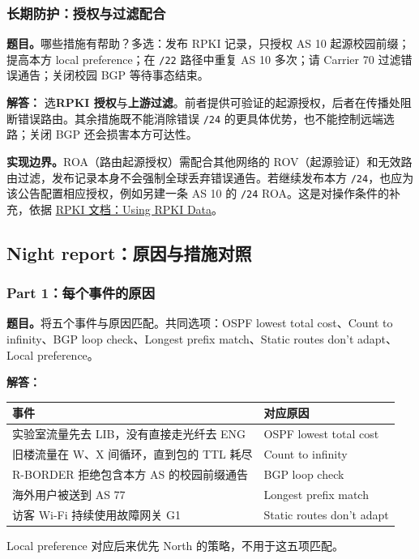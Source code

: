 \documentclass[11pt,a4paper,fontset=fandol]{ctexart}
\renewcommand{\exercisequestion}[2]{%
  \Needspace{5\baselineskip}%
  \subsubsection{#2}\label{exercise:#1}%
}
\renewenvironment{checkedsolution}
  {\par\nopagebreak[4]\textbf{解答：}\ignorespaces}
  {\par}
\begin{document}
\exercisequestion{SC2008-HW03-Q21}{长期防护：授权与过滤配合}
\textbf{题目。}哪些措施有帮助？多选：发布 RPKI 记录，只授权 AS 10 起源校园前缀；提高本方 local preference；在 \texttt{/22} 路径中重复 AS 10 多次；请 Carrier 70 过滤错误通告；关闭校园 BGP 等待事态结束。
\begin{checkedsolution}
选\textbf{RPKI 授权}与\textbf{上游过滤}。前者提供可验证的起源授权，后者在传播处阻断错误路由。其余措施既不能消除错误 \texttt{/24} 的更具体优势，也不能控制远端选路；关闭 BGP 还会损害本方可达性。

\textbf{实现边界。}ROA（路由起源授权）需配合其他网络的 ROV（起源验证）和无效路由过滤，发布记录本身不会强制全球丢弃错误通告。若继续发布本方 \texttt{/24}，也应为该公告配置相应授权，例如另建一条 AS 10 的 \texttt{/24} ROA。这是对操作条件的补充，依据 \href{https://rpki.readthedocs.io/en/latest/rpki/using-rpki-data.html}{RPKI 文档：Using RPKI Data}。
\end{checkedsolution}

\subsection{Night report：原因与措施对照}

\exercisequestion{SC2008-HW03-Q22}{Part 1：每个事件的原因}
\textbf{题目。}将五个事件与原因匹配。共同选项：OSPF lowest total cost、Count to infinity、BGP loop check、Longest prefix match、Static routes don't adapt、Local preference。
\begin{checkedsolution}
\begin{center}
\small
\begin{tabularx}{\textwidth}{@{}Xl@{}}
\toprule
事件 & 对应原因 \\
\midrule
实验室流量先去 LIB，没有直接走光纤去 ENG & OSPF lowest total cost \\
旧楼流量在 W、X 间循环，直到包的 TTL 耗尽 & Count to infinity \\
R-BORDER 拒绝包含本方 AS 的校园前缀通告 & BGP loop check \\
海外用户被送到 AS 77 & Longest prefix match \\
访客 Wi-Fi 持续使用故障网关 G1 & Static routes don't adapt \\
\bottomrule
\end{tabularx}
\end{center}
Local preference 对应后来优先 North 的策略，不用于这五项匹配。
\end{checkedsolution}
\end{document}
